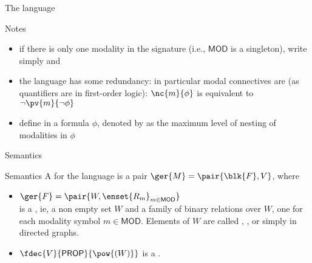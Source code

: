 \documentclass{beamer}
\begin{document}
\begin{slide}{The language}\label{s:11}
\small
\begin{block}{Notes}
\begin{itemize}
\item if there is only one modality in the signature (i.e., $\mathsf{MOD}$ is a singleton), write simply \dgold{$\eventual \phi$} and \dgold{$\always \phi$}
\item the language has some redundancy: in particular modal connectives are  (as quantifiers are in first-order logic):
$\nc{m}{\phi}$ is equivalent to  $\neg \pv{m}{\neg \phi}$
\item define  in a formula $\phi$, denoted by \dgold{$\mdepth{\phi}$} as the maximum level of nesting of modalities in $\phi$
\end{itemize}
\end{block}

\end{slide}

\begin{slide}{Semantics}\label{s:12}
\small
\begin{block}{Semantics}
A  for the language is a pair $\ger{M} = \pair{\blk{F},V}$, where
\begin{itemize}
\item $\ger{F} = \pair{W, \enset{R_m}_{m \in \mathsf{MOD}}}$  \\ is a , ie, a non empty set $W$ and a family of binary relations
over $W$, one for each modality symbol $m \in \mathsf{MOD}$. Elements of $W$ are called ,  ,   or
simply   in  directed graphs. 
\item $\fdec{V}{\mathsf{PROP}}{\pow{(W)}}$ is a .
\end{itemize}
\end{block}
\end{slide}
\end{document}
